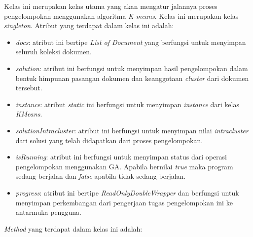 Kelas ini merupakan kelas utama yang akan mengatur jalannya proses pengelompokan menggunakan algoritma \textit{K-means}. Kelas ini merupakan kelas \textit{singleton}. Atribut yang terdapat dalam kelas ini adalah:

\begin{itemize}
	\item \textit{docs}: atribut ini bertipe \textit{List of Document} yang berfungsi untuk menyimpan seluruh koleksi dokumen.
	\item \textit{solution}: atribut ini berfungsi untuk menyimpan hasil pengelompokan dalam bentuk himpunan pasangan dokumen dan keanggotaan \textit{cluster} dari dokumen tersebut.
	\item \textit{instance}: atribut \textit{static} ini berfungsi untuk menyimpan \textit{instance} dari kelas \textit{KMeans}.
	\item \textit{solutionIntracluster}: atribut ini berfungsi untuk menyimpan nilai \textit{intracluster} dari solusi yang telah didapatkan dari proses pengelompokan.
	\item \textit{isRunning}: atribut ini berfungsi untuk menyimpan status dari operasi pengelompokan menggunakan GA. Apabila bernilai \textit{true} maka program sedang berjalan dan \textit{false} apabila tidak sedang berjalan.
	\item \textit{progress}: atribut ini bertipe \textit{ReadOnlyDoubleWrapper} dan berfungsi untuk menyimpan perkembangan dari pengerjaan tugas pengelompokan ini ke antarmuka pengguna.
\end{itemize}

\textit{Method} yang terdapat dalam kelas ini adalah:

